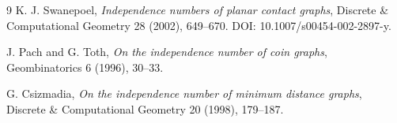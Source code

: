 \documentclass[11pt]{article}
\begin{document}
\begin{thebibliography}{9}
K. J. Swanepoel,
\textit{Independence numbers of planar contact graphs},
Discrete \& Computational Geometry 28 (2002), 649--670.
DOI: 10.1007/s00454-002-2897-y.

J. Pach and G. Toth,
\textit{On the independence number of coin graphs},
Geombinatorics 6 (1996), 30--33.

G. Csizmadia,
\textit{On the independence number of minimum distance graphs},
Discrete \& Computational Geometry 20 (1998), 179--187.
\end{thebibliography}
\end{document}
